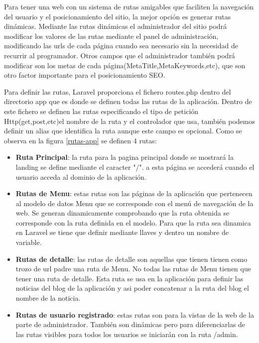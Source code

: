 Para tener una web con un sistema de rutas amigables que faciliten la navegación del usuario y el posicionamiento del sitio, la mejor opción es generar rutas dinámicas. Mediante las rutas dinámicas el administrador del sitio podrá modificar los valores de las rutas mediante el panel de administración, modificando las urls de cada página cuando sea necesario sin la necesidad de recurrir al programador. Otros campos que el administrador también podrá modificar son los metas de cada página(MetaTitle,MetaKeywords,etc), que son otro factor importante para el posicionamiento SEO.

\vspace{5 mm}

Para definir las rutas, Laravel proporciona el fichero routes.php dentro del directorio app que es donde se definen todas las rutas de la aplicación. Dentro de este fichero se definen las rutas especificando el tipo de petición Http(get,post,etc)el nombre de la ruta y el controlador que usa, también podemos definir un alias que identifica la ruta aunque este campo es opcional. Como se observa en la figura \ref{rutas-app} se definen 4 rutas:

\begin{itemize}

\item \textbf{Ruta Principal}: la ruta para la pagina principal donde se mostrará la landing se define mediante el caracter "/". a esta página se accederá cuando el usuario acceda al dominio de la aplicación.

\item \textbf{Rutas de Menu}: estas rutas son las páginas de la aplicación que pertenecen al modelo de datos Menu que se corresponde con el menú de navegación de la web. Se generan dinamicamente comprobando que la ruta obtenida se corresponde con la ruta definida en el modelo. Para que la ruta sea dinamica en Laravel se tiene que definir mediante llaves y dentro un nombre de variable.

\item \textbf{Rutas de detalle}: las rutas de detalle son aquellas que tienen tienen como trozo de url padre una ruta de Menu. No todas las rutas de Menu tienen que tener una ruta de detalle. Esta ruta se usa en la aplicación para definir las noticias del blog de la aplicación y asi poder concatenar a la ruta del blog el nombre de la noticia.

\item \textbf{Rutas de usuario registrado}: estas rutas son para la vistas de la web de la parte de administrador. También son dinámicas pero para diferenciarlas de las rutas visibles para todos los usuarios se iniciarán con la ruta /admin.

\end{itemize} 


